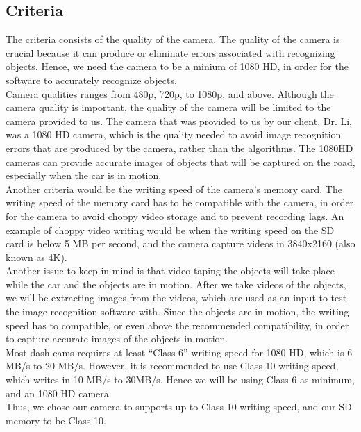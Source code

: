 \documentclass[10pt,draftclsnofoot,onecolumn,journal,compsoc]{IEEEtran}
\begin{document}
\subsection{Criteria}
The criteria consists of the quality of the camera. The quality of the camera is crucial because it can produce or eliminate errors associated with recognizing objects. Hence, we need the camera to be a minium of 1080 HD, in order for the software to accurately recognize objects. \\

Camera qualities ranges from 480p, 720p, to 1080p, and above. Although the camera quality is important, the quality of the camera will be limited to the camera provided to us. The camera that was provided to us by our client, Dr. Li, was a 1080 HD camera, which is the quality needed to avoid image recognition errors that are produced by the camera, rather than the algorithms. The 1080HD cameras can provide accurate images of objects that will be captured on the road, especially when the car is in motion.\\

Another criteria would be the writing speed of the camera’s memory card. The writing speed of the memory card has to be compatible with the camera, in order for the camera to avoid choppy video storage and to prevent recording lags. An example of choppy video writing would be when the writing speed on the SD card is below 5 MB per second, and the camera capture videos in 3840x2160 (also known as 4K).\\

Another issue to keep in mind is that video taping the objects will take place while the car and the objects are in motion. After we take videos of the objects, we will be extracting images from the videos, which are used as an input to test the image recognition software with. Since the objects are in motion, the writing speed has to compatible, or even above the recommended compatibility, in order to capture accurate images of the objects in motion.\\

Most dash-cams requires at least “Class 6” writing speed for 1080 HD, which is 6 MB/s to 20 MB/s. However, it is recommended to use Class 10 writing speed, which writes in 10 MB/s to 30MB/s. Hence we will be using Class 6 as minimum, and an 1080 HD camera.\\

Thus, we chose our camera to supports up to Class 10 writing speed, and our SD memory to be Class 10.
\end{document}

